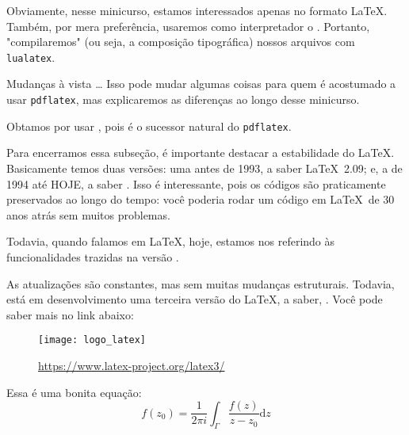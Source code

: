 Obviamente, nesse minicurso, estamos interessados apenas no formato \LaTeX.
Também, por mera preferência, usaremos como interpretador o .
Portanto, "compilaremos" (ou seja, a composição tipográfica) nossos arquivos 
com \texttt{lualatex}.

\begin{atencao}{Mudanças à vista \ldots}{\exclamacao}
  Isso pode mudar algumas coisas para quem é acostumado a usar \texttt{pdflatex}, 
  mas explicaremos as diferenças ao longo desse minicurso.  
\end{atencao}

Obtamos por usar \lualatex, pois é o sucessor natural do \texttt{pdflatex}. 

Para encerramos essa subseção, é importante destacar a estabilidade do \LaTeX.
Basicamente temos duas versões: uma antes de 1993, a saber \LaTeX~2.09; e,
a de 1994 até HOJE, a saber .
Isso é interessante, pois os códigos são praticamente preservados ao longo do 
tempo: você poderia rodar um código em \LaTeX\ de 30 anos atrás sem muitos 
problemas.

Todavia, quando falamos em \LaTeX{}, hoje, estamos nos referindo às 
funcionalidades trazidas na versão .

As atualizações são constantes, mas sem muitas mudanças estruturais.
Todavia, está em desenvolvimento uma terceira versão do \LaTeX, a saber, .
Você pode saber mais no link abaixo:

\begin{figure}[!htbp]
  \centering
  \texttt{[image: logo\_latex]}
  \caption{\href{https://www.latex-project.org/latex3/}{\textcolor{azulUFRB}{https://www.latex-project.org/latex3/}}}
\end{figure}


\begin{codeLaTeX}
Essa é uma bonita equação:
\[
  f(z_0) = \frac{1}{2 \pi i} \int_{\Gamma} \frac{f(z)}{z - z_0} \mathrm{d}z  
\]
\end{codeLaTeX}